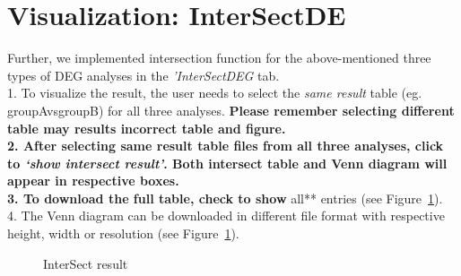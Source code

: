 \documentclass[
  a4paper,
  DIV=11,
  numbers=noendperiod,
  oneside,
  open=any]{scrreport}
\begin{document}
\section{Visualization: InterSectDE}\label{visualization-intersectde}

Further, we implemented intersection function for the above-mentioned
three types of DEG analyses in the \emph{'InterSectDEG} tab.\\
1. To visualize the result, the user needs to select the \emph{same
result} table (eg. groupAvsgroupB) for all three analyses.
\textbf{Please remember selecting different table may results incorrect
table and figure.\\
2. After selecting same result table files from all three analyses,
click to \emph{`show intersect result'}. Both intersect table and Venn
diagram will appear in respective boxes.\\
3. To download the full table, check to show }all** entries (see
Figure~\ref{fig-trans9}).\\
4. The Venn diagram can be downloaded in different file format with
respective height, width or resolution (see Figure~\ref{fig-trans9}).

\begin{figure}[H]


\caption{\label{fig-trans9}InterSect result}

\end{figure}%
\end{document}
